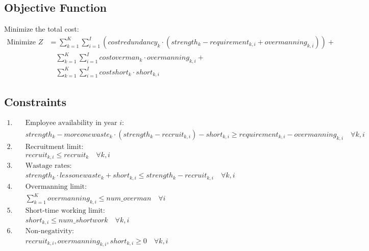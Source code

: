 \documentclass{article}
\begin{document}
\subsection*{Objective Function}
Minimize the total cost:
\begin{align*}
\text{Minimize } Z &= \sum_{k=1}^{K} \sum_{i=1}^{I} \left( costredundancy_k \cdot (strength_k - requirement_{k,i} + overmanning_{k,i}) \right) + \\
&\quad \sum_{k=1}^{K} \sum_{i=1}^{I} costoverman_k \cdot overmanning_{k,i} + \\
&\quad \sum_{k=1}^{K} \sum_{i=1}^{I} costshort_k \cdot short_{k,i}
\end{align*}

\subsection*{Constraints}
\begin{align*}
1. & \quad \text{Employee availability in year } i: \\
   & \quad strength_k - moreonewaste_k \cdot (strength_k - recruit_{k,i}) - short_{k,i} \geq requirement_{k,i} - overmanning_{k,i} \quad \forall k, i \\
2. & \quad \text{Recruitment limit: } \\
   & \quad recruit_{k,i} \leq recruit_k \quad \forall k, i \\
3. & \quad \text{Wastage rates: } \\
   & \quad strength_k \cdot lessonewaste_k + short_{k,i} \leq strength_k - recruit_{k,i} \quad \forall k, i \\
4. & \quad \text{Overmanning limit: } \\
   & \quad \sum_{k=1}^{K} overmanning_{k,i} \leq num\_overman \quad \forall i \\
5. & \quad \text{Short-time working limit: } \\
   & \quad short_{k,i} \leq num\_shortwork \quad \forall k, i \\
6. & \quad \text{Non-negativity: } \\
   & \quad recruit_{k,i}, overmanning_{k,i}, short_{k,i} \geq 0 \quad \forall k, i
\end{align*}
\end{document}
